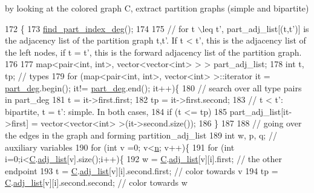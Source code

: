 by looking at the colored graph C, extract partition graphs (simple and bipartite) 


\begin{DoxyCode}
172 \{
173   \hyperlink{classmarked__graph__encoder_a1cb2cd754108302a0437a924dc70bc0e}{find\_part\_index\_deg}();
174 
175   \textcolor{comment}{// for t \(\backslash\)leq t', part\_adj\_list[(t,t')] is the adjacency list of the partition graph t,t'. If t < t',
       this is the adjacency list of the left nodes, if t = t', this is the forward adjacency list of the partition
       graph.}
176 
177   map<pair<int, int>, vector<vector<int> > > part\_adj\_list;
178   \textcolor{keywordtype}{int} t, tp; \textcolor{comment}{// types }
179   \textcolor{keywordflow}{for} (map<pair<int, int>, vector<int> >::iterator it = \hyperlink{classmarked__graph__encoder_a55ea2edb2609dfc287432f61900d6ad1}{part\_deg}.begin(); it!= 
      \hyperlink{classmarked__graph__encoder_a55ea2edb2609dfc287432f61900d6ad1}{part\_deg}.end(); it++)\{
180     \textcolor{comment}{// search over all type pairs in part\_deg}
181     t = it->first.first;
182     tp = it->first.second;
183     \textcolor{comment}{// t < t': bipartite, t = t': simple. In both cases, }
184     \textcolor{keywordflow}{if} (t <= tp)
185       part\_adj\_list[it->first] = vector<vector<int> >(it->second.size());
186   \}
187 
188   \textcolor{comment}{// going over the edges in the graph and forming partition\_adj\_list}
189   \textcolor{keywordtype}{int} w, p, q; \textcolor{comment}{// auxiliary variables }
190   \textcolor{keywordflow}{for} (\textcolor{keywordtype}{int} v =0; v<\hyperlink{classmarked__graph__encoder_a4c66d9fdbc14c97523715aac7e4511cb}{n}; v++)\{
191     \textcolor{keywordflow}{for} (\textcolor{keywordtype}{int} i=0;i<\hyperlink{classmarked__graph__encoder_af82bc0653414091291cb75553a407bdb}{C}.\hyperlink{classcolored__graph_a45dce16965079286cf3f41a54a1b2ea4}{adj\_list}[v].size();i++)\{
192       w = \hyperlink{classmarked__graph__encoder_af82bc0653414091291cb75553a407bdb}{C}.\hyperlink{classcolored__graph_a45dce16965079286cf3f41a54a1b2ea4}{adj\_list}[v][i].first; \textcolor{comment}{// the other endpoint}
193       t = \hyperlink{classmarked__graph__encoder_af82bc0653414091291cb75553a407bdb}{C}.\hyperlink{classcolored__graph_a45dce16965079286cf3f41a54a1b2ea4}{adj\_list}[v][i].second.first; \textcolor{comment}{// color towards v}
194       tp = \hyperlink{classmarked__graph__encoder_af82bc0653414091291cb75553a407bdb}{C}.\hyperlink{classcolored__graph_a45dce16965079286cf3f41a54a1b2ea4}{adj\_list}[v][i].second.second; \textcolor{comment}{// color towards w}

\end{DoxyCode}
